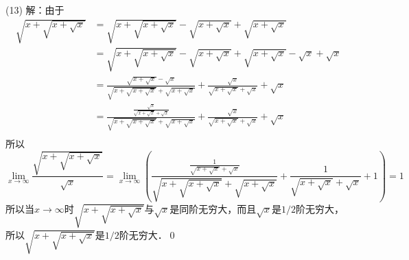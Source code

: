 \medskip
(13) 解：由于
\begin{align}
    \displaystyle\sqrt{x+\displaystyle\sqrt{x+\displaystyle\sqrt{x}}} &= \displaystyle\sqrt{x+\displaystyle\sqrt{x+\displaystyle\sqrt{x}}} - \displaystyle\sqrt{x+\displaystyle\sqrt{x}} + \displaystyle\sqrt{x+\displaystyle\sqrt{x}} \\
    &= \displaystyle\sqrt{x+\displaystyle\sqrt{x+\displaystyle\sqrt{x}}} - \displaystyle\sqrt{x+\displaystyle\sqrt{x}} + \displaystyle\sqrt{x+\displaystyle\sqrt{x}} - \sqrt{x} + \sqrt{x} \\
    &= \frac{\displaystyle\sqrt{x+\displaystyle\sqrt{x}}-\displaystyle\sqrt{x}}{\displaystyle\sqrt{x+\displaystyle\sqrt{x+\displaystyle\sqrt{x}}}+\displaystyle\sqrt{x+\displaystyle\sqrt{x}}} + \displaystyle\frac{\displaystyle\sqrt{x}}{\displaystyle\sqrt{x+\displaystyle\sqrt{x}}+\displaystyle\sqrt{x}} + \sqrt{x} \\
    &= \frac{\displaystyle\frac{\displaystyle\sqrt{x}}{\displaystyle\sqrt{x+\displaystyle\sqrt{x}}+\displaystyle\sqrt{x}}}{\displaystyle\sqrt{x+\displaystyle\sqrt{x+\displaystyle\sqrt{x}}}+\displaystyle\sqrt{x+\displaystyle\sqrt{x}}} + \displaystyle\frac{\displaystyle\sqrt{x}}{\displaystyle\sqrt{x+\displaystyle\sqrt{x}}+\displaystyle\sqrt{x}} + \sqrt{x} \\
\end{align}
所以
\begin{equation}
    \lim_{x \to \infty} \frac{\displaystyle\sqrt{x+\displaystyle\sqrt{x+\displaystyle\sqrt{x}}}}{\displaystyle\sqrt{x}} = \lim_{x \to \infty} \left( \frac{\displaystyle\frac{1}{\displaystyle\sqrt{x+\displaystyle\sqrt{x}}+\displaystyle\sqrt{x}}}{\displaystyle\sqrt{x+\displaystyle\sqrt{x+\displaystyle\sqrt{x}}}+ \displaystyle\sqrt{x+\displaystyle\sqrt{x}}} + \frac{1}{\displaystyle\sqrt{x+\displaystyle\sqrt{x}}+\displaystyle\sqrt{x}} + 1 \right) = 1
\end{equation}
所以当$x \to \infty$时$\displaystyle\sqrt{x+\displaystyle\sqrt{x+\displaystyle\sqrt{x}}}$与$\sqrt{x}$是同阶无穷大，而且$\displaystyle\sqrt{x}$是$1/2$阶无穷大，所以$\displaystyle\sqrt{x+\displaystyle\sqrt{x+\displaystyle\sqrt{x}}}$是$1/2$阶无穷大．\qed

